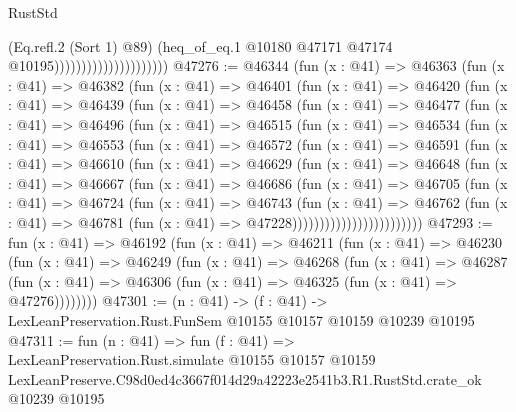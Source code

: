 \begin{lexlean}{RustStd}
\begin{coremodule}
                                            (Eq.refl.{2} (Sort 1) @89)
                                            (heq_of_eq.{1}
                                              @10180
                                              @47171
                                              @47174
                                              @10195)))))))))))))))))))))
@47276 := @46344
    (fun (x : @41) =>
    @46363
      (fun (x : @41) =>
      @46382
        (fun (x : @41) =>
        @46401
          (fun (x : @41) =>
          @46420
            (fun (x : @41) =>
            @46439
              (fun (x : @41) =>
              @46458
                (fun (x : @41) =>
                @46477
                  (fun (x : @41) =>
                  @46496
                    (fun (x : @41) =>
                    @46515
                      (fun (x : @41) =>
                      @46534
                        (fun (x : @41) =>
                        @46553
                          (fun (x : @41) =>
                          @46572
                            (fun (x : @41) =>
                            @46591
                              (fun (x : @41) =>
                              @46610
                                (fun (x : @41) =>
                                @46629
                                  (fun (x : @41) =>
                                  @46648
                                    (fun (x : @41) =>
                                    @46667
                                      (fun (x : @41) =>
                                      @46686
                                        (fun (x : @41) =>
                                        @46705
                                          (fun (x : @41) =>
                                          @46724
                                            (fun (x : @41) =>
                                            @46743
                                              (fun (x : @41) =>
                                              @46762
                                                (fun (x : @41) =>
                                                @46781
                                                  (fun (x : @41) => @47228))))))))))))))))))))))))
@47293 := fun (x : @41) =>
  @46192
    (fun (x : @41) =>
    @46211
      (fun (x : @41) =>
      @46230
        (fun (x : @41) =>
        @46249
          (fun (x : @41) =>
          @46268
            (fun (x : @41) =>
            @46287
              (fun (x : @41) => @46306 (fun (x : @41) => @46325 (fun (x : @41) => @47276))))))))
@47301 := (n : @41) ->
  (f : @41) -> LexLeanPreservation.Rust.FunSem @10155 @10157 @10159 @10239 @10195
@47311 := fun (n : @41) =>
  fun (f : @41) =>
  LexLeanPreservation.Rust.simulate
    @10155
    @10157
    @10159
    LexLeanPreserve.C98d0ed4c3667f014d29a42223e2541b3.R1.RustStd.crate_ok
    @10239
    @10195
\end{coremodule}
\end{lexlean}

